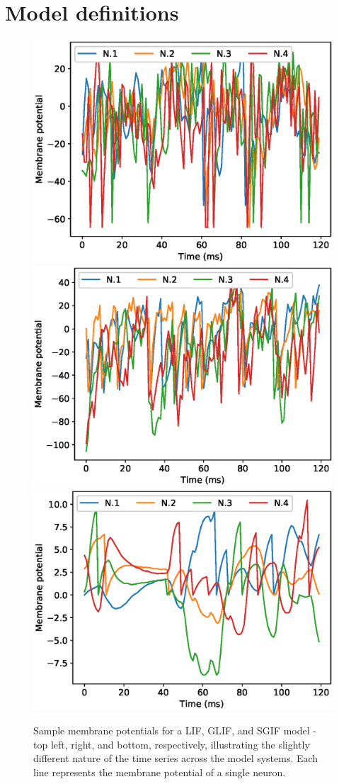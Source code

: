 \documentclass[mphil,deptreport,ianc]{infthesis} %
\begin{document}


\section{Model definitions}

\begin{figure}
    \centering
    \includegraphics[width=0.7\linewidth]{figures/samples/membrane_potentials/export_sample_LIF_white_noise.eps}
    \includegraphics[width=0.7\linewidth]{figures/samples/membrane_potentials/export_sample_GLIF_white_noise.eps}
    \includegraphics[width=0.7\linewidth]{figures/samples/membrane_potentials/export_sample_mesoGIF_white_noise.eps}
    \caption{Sample membrane potentials for a LIF, GLIF, and SGIF model - top left, right, and bottom, respectively, illustrating the slightly different nature of the time series across the model systems. Each line represents the membrane potential of a single neuron.}
    \label{fig:membrane_potential_samples}
    \vskip -0.2in
\end{figure}
\end{document}
